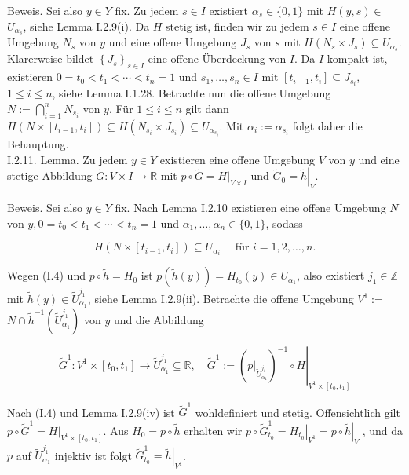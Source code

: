 \documentclass[10pt]{article}
\begin{document}
Beweis. Sei also $y \in Y$ fix. Zu jedem $s \in I$ existiert $\alpha_{s} \in\{0,1\}$ mit $H(y, s) \in$ $U_{\alpha_{s}}$, siehe Lemma I.2.9(i). Da $H$ stetig ist, finden wir zu jedem $s \in I$ eine offene Umgebung $N_{s}$ von $y$ und eine offene Umgebung $J_{s}$ von $s$ mit $H\left(N_{s} \times J_{s}\right) \subseteq U_{\alpha_{s}}$. Klarerweise bildet $\left\{J_{s}\right\}_{s \in I}$ eine offene Überdeckung von $I$. Da $I$ kompakt ist, existieren $0=t_{0}<t_{1}<\cdots<t_{n}=1$ und $s_{1}, \ldots, s_{n} \in I$ mit $\left[t_{i-1}, t_{i}\right] \subseteq J_{s_{i}}$, $1 \leq i \leq n$, siehe Lemma I.1.28. Betrachte nun die offene Umgebung $N:=\bigcap_{i=1}^{n} N_{s_{i}}$ von $y$. Für $1 \leq i \leq n$ gilt dann $H\left(N \times\left[t_{i-1}, t_{i}\right]\right) \subseteq H\left(N_{s_{i}} \times J_{s_{i}}\right) \subseteq U_{\alpha_{s_{i}}}$. Mit $\alpha_{i}:=\alpha_{s_{i}}$ folgt daher die Behauptung.\\
I.2.11. Lemma. Zu jedem $y \in Y$ existieren eine offene Umgebung $V$ von $y$ und eine stetige Abbildung $\tilde{G}: V \times I \rightarrow \mathbb{R}$ mit $p \circ \tilde{G}=\left.H\right|_{V \times I}$ und $\tilde{G}_{0}=\left.\tilde{h}\right|_{V}$.

Beweis. Sei also $y \in Y$ fix. Nach Lemma I.2.10 existieren eine offene Umgebung $N$ von $y, 0=t_{0}<t_{1}<\cdots<t_{n}=1$ und $\alpha_{1}, \ldots, \alpha_{n} \in\{0,1\}$, sodass

$$
H\left(N \times\left[t_{i-1}, t_{i}\right]\right) \subseteq U_{\alpha_{i}} \quad \text { für } i=1,2, \ldots, n .
$$

Wegen (I.4) und $p \circ \tilde{h}=H_{0}$ ist $p(\tilde{h}(y))=H_{t_{0}}(y) \in U_{\alpha_{1}}$, also existiert $j_{1} \in \mathbb{Z}$ mit $\tilde{h}(y) \in \tilde{U}_{\alpha_{1}}^{j_{1}}$, siehe Lemma I.2.9(ii). Betrachte die offene Umgebung $V^{1}:=$ $N \cap \tilde{h}^{-1}\left(\tilde{U}_{\alpha_{1}}^{j_{1}}\right)$ von $y$ und die Abbildung

$$
\tilde{G}^{1}: V^{1} \times\left[t_{0}, t_{1}\right] \rightarrow \tilde{U}_{\alpha_{1}}^{j_{1}} \subseteq \mathbb{R}, \quad \tilde{G}^{1}:=\left.\left(\left.p\right|_{\tilde{U}_{\alpha_{1}}^{j_{1}}}\right)^{-1} \circ H\right|_{V^{1} \times\left[t_{0}, t_{1}\right]}
$$

Nach (I.4) und Lemma I.2.9(iv) ist $\tilde{G}^{1}$ wohldefiniert und stetig. Offensichtlich gilt $p \circ \tilde{G}^{1}=\left.H\right|_{V^{1} \times\left[t_{0}, t_{1}\right]}$. Aus $H_{0}=p \circ \tilde{h}$ erhalten wir $p \circ \tilde{G}_{t_{0}}^{1}=\left.H_{t_{0}}\right|_{V^{1}}=\left.p \circ \tilde{h}\right|_{V^{1}}$, und da $p$ auf $\tilde{U}_{\alpha_{1}}^{j_{1}}$ injektiv ist folgt $\tilde{G}_{t_{0}}^{1}=\left.\tilde{h}\right|_{V^{1}}$.
\end{document}
